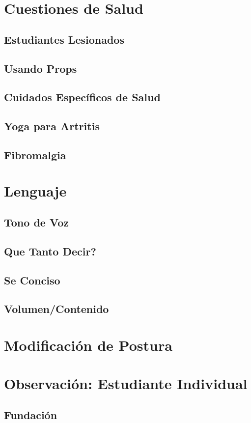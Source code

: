 \section{Cuestiones de Salud}
\subsection{Estudiantes Lesionados}
\subsection{Usando Props}
\subsection{Cuidados Específicos de Salud}
\subsection{Yoga para Artritis}
\subsection{Fibromalgia}
\section{Lenguaje}
\subsection{Tono de Voz}
\subsection{Que Tanto Decir?}
\subsection{Se Conciso}
\subsection{Volumen/Contenido}
\section{Modificación de Postura}
\section{Observación: Estudiante Individual}
\subsection{Fundación}
